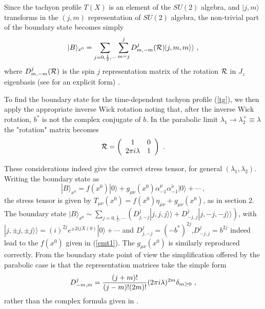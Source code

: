\documentclass[a4paper,12pt]{article}
\begin{document}
Since the tachyon profile $T(X)$ is an element of the $SU(2)$ algebra, and 
$|j,m \rangle$ transforms in the $(j,m)$ representation of $SU(2)$ algebra, 
the non-trivial part of the boundary state becomes simply
\cite{Callan et al, PoTh, ReSc} 
\begin{equation}
|B \rangle_{x^0} =  \sum_{j=0, \frac{1}{2}, \cdots}
\sum_{m=j}^j D_{m,-m}^j ( {\cal R}) | j,m,m \rangle \rangle ~,
\end{equation}
where $D_{m,-m}^j({\cal R})$ is the spin $j$ representation matrix of 
the rotation ${\cal R}$ in $J_z$ eigenbasis (see \cite{ReSc} for an explicit form) .

To find the boundary state for the time-dependent tachyon profile (\ref{tg}), 
we then apply the appropriate inverse Wick rotation noting that, after the inverse 
Wick rotation, $b^*$ is not the complex conjugate of $b$. In the parabolic
limit $\lambda_1\to\lambda^+_2\equiv\lambda$ the "rotation" matrix becomes
\begin{equation}
{\cal R} = 
\left( \begin{array}{cc} 1 & 0 \\ 2\pi i \lambda &  1 \end{array} \right)~.
\label{parR}
\end{equation}

These considerations indeed give the correct stress tensor, for general 
$(\lambda_1,\lambda_2)$. Writing the boundary state as 
\begin{equation}
|B \rangle_{x^0} =  f(x^0) |0 \rangle +
g_{\mu \nu}(x^0) \alpha^\mu_{-1} \overline{\alpha^\nu_{-1}} |0 \rangle
+\cdots~,
\end{equation}
the stress tensor is given by 
$T_{\mu \nu}(x^0)=f (x^0)\eta_{\mu \nu} + g _{\mu \nu}(x^0)$,
as in section 2. The boundary state
$|B \rangle_{x^0} \sim \sum_{j=0, \frac{1}{2}, \cdots}
( D_{j,-j}^j | j,j,j \rangle \rangle 
+ D_{-j,j}^j | j,-j,-j \rangle \rangle)$, with
$| j,\pm j,\pm j \rangle \rangle=(i)^{2j} e^{\pm 2 i j X(0)} 
|0 \rangle+\cdots$ and $D_{j,-j}^j= (-b^*)^{2j}$,$D_{-j,j}^j=b^{2j}$
indeed lead to the $f(x^0)$ given in  (\ref{emt1}). The
$g _{\mu \nu}(x^0)$ is similarly reproduced correctly. From the boundary state point
of view the simplification offered by the parabolic case is that the
representation matrices take the simple form
\begin{equation}
D^j_{-m,m}= {(j+m)! \over (j-m)! (2 m)!  }  (2 \pi i \lambda)^{2m} \delta_{m \geq 0}~,
\end{equation}
rather than the complex formula given in \cite{ReSc}.
\end{document}
